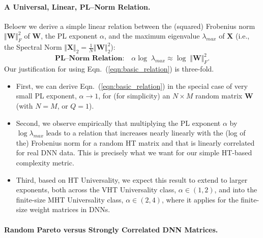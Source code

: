 \paragraph{A Universal, Linear,  PL--Norm Relation.} 
Beloew we derive a simple linear relation between the (squared) Frobenius norm $\Vert\mathbf{W}\Vert^{2}_{F}$ of $\mathbf{W}$, the PL exponent $\alpha$, and the maximum eigenvalue $\lambda_{max}$ of $\mathbf{X}$ (i.e., the Spectral Norm $\Vert\mathbf{X}\Vert_{2}=\frac{1}{N}\Vert\mathbf{W}\Vert^{2}_{2}$):  
\begin{equation}
\textbf{PL--Norm Relation:} \quad \alpha\log\;\lambda_{max}\approx\log\;\Vert\mathbf{W}\Vert^{2}_{F}  .
\label{eqn:basic_relation}
\end{equation}
Our justification for using Eqn.~(\ref{eqn:basic_relation}) is three-fold.
\begin{itemize}
\item First, we can derive Eqn.~(\ref{eqn:basic_relation}) in the special case of very small PL exponent, $\alpha \rightarrow 1$, for (for simplicity) an $N\times M$ random matrix $\mathbf{W}$ (with $N=M$, or $Q=1$).
\item Second, we observe empirically that multiplying the PL exponent $\alpha$ by $\log\lambda_{max}$ leads to a relation that increases nearly linearly with the (log of the) Frobenius norm for a random HT matrix and that is linearly correlated for real DNN data. 
This is precisely what we want for our simple HT-based complexity metric.
\item Third, based on HT Universality, we expect this result to extend to larger exponents, both across the VHT Universality class, $\alpha\in(1,2)$, and into the finite-size MHT Universality class, $\alpha\in(2,4)$, where it applies for the finite-size weight matrices in DNNs.
\end{itemize}



\paragraph{Random Pareto versus Strongly Correlated DNN Matrices.} 

